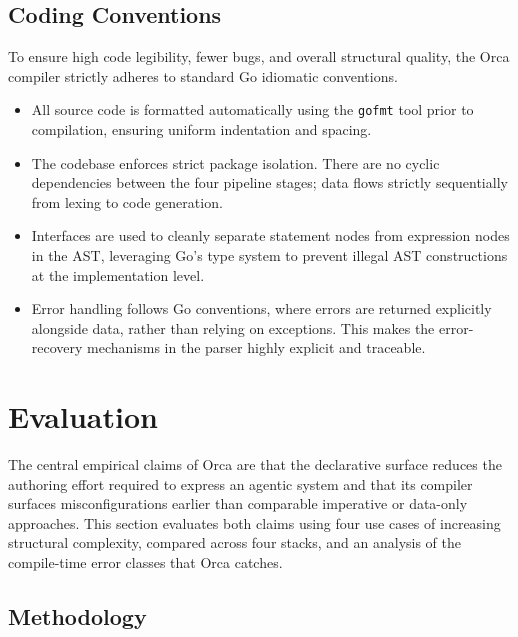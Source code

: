 \documentclass[sigconf,nonacm]{acmart}
\begin{document}
\subsection{Coding Conventions}
\label{sec:implementation:conventions}

To ensure high code legibility, fewer bugs, and overall structural quality,
the Orca compiler strictly adheres to standard Go idiomatic conventions.
\begin{itemize}[leftmargin=*]
  \item All source code is formatted automatically using the \texttt{gofmt}
        tool prior to compilation, ensuring uniform indentation and spacing.
  \item The codebase enforces strict package isolation. There are no cyclic
        dependencies between the four pipeline stages; data flows strictly
        sequentially from lexing to code generation.
  \item Interfaces are used to cleanly separate statement nodes from
        expression nodes in the AST, leveraging Go's type system to prevent
        illegal AST constructions at the implementation level.
  \item Error handling follows Go conventions, where errors are returned
        explicitly alongside data, rather than relying on exceptions. This
        makes the error-recovery mechanisms in the parser highly explicit and
        traceable.
\end{itemize}

\section{Evaluation}
\label{sec:evaluation}

The central empirical claims of Orca are that the declarative surface
reduces the authoring effort required to express an agentic system and
that its compiler surfaces misconfigurations earlier than comparable
imperative or data-only approaches. This section evaluates both claims
using four use cases of increasing structural complexity, compared across
four stacks, and an analysis of the compile-time error classes that Orca
catches.

\subsection{Methodology}
\label{sec:evaluation:methodology}
\end{document}
